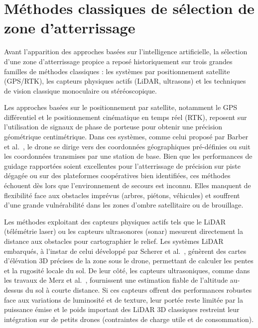 \section{Méthodes classiques de sélection de zone d'atterrissage}
\label{sec:methodes-classiques}

Avant l'apparition des approches basées sur l'intelligence artificielle, la sélection d'une zone d'atterrissage propice a reposé historiquement sur trois grandes familles de méthodes classiques : les systèmes par positionnement satellite (GPS/RTK), les capteurs physiques actifs (LiDAR, ultrasons) et les techniques de vision classique monoculaire ou stéréoscopique.

Les approches basées sur le positionnement par satellite, notamment le GPS différentiel et le positionnement cinématique en temps réel (RTK), reposent sur l'utilisation de signaux de phase de porteuse pour obtenir une précision géométrique centimétrique. Dans ces systèmes, comme celui proposé par Barber et al.~\cite{barber2007autonomous}, le drone se dirige vers des coordonnées géographiques pré-définies ou suit les coordonnées transmises par une station de base. Bien que les performances de guidage rapportées soient excellentes pour l'atterrissage de précision sur piste dégagée ou sur des plateformes coopératives bien identifiées, ces méthodes échouent dès lors que l'environnement de secours est inconnu. Elles manquent de flexibilité face aux obstacles imprévus (arbres, piétons, véhicules) et souffrent d'une grande vulnérabilité dans les zones d'ombre satellitaire ou de brouillage.

Les méthodes exploitant des capteurs physiques actifs tels que le LiDAR (télémétrie laser) ou les capteurs ultrasonores (sonar) mesurent directement la distance aux obstacles pour cartographier le relief. Les systèmes LiDAR embarqués, à l'instar de celui développé par Scherer et al.~\cite{scherer2012autonomous}, génèrent des cartes d'élévation 3D précises de la zone sous le drone, permettant de calculer les pentes et la rugosité locale du sol. De leur côté, les capteurs ultrasoniques, comme dans les travaux de Merz et al.~\cite{merz2006autonomous}, fournissent une estimation fiable de l'altitude au-dessus du sol à courte distance. Si ces capteurs offrent des performances robustes face aux variations de luminosité et de texture, leur portée reste limitée par la puissance émise et le poids important des LiDAR 3D classiques restreint leur intégration sur de petits drones (contraintes de charge utile et de consommation).

